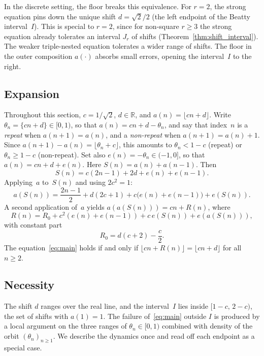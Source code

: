\documentclass{birkjour}
\theoremstyle{definition}
\theoremstyle{remark}
\newcommand{\fl}[1]{\lfloor #1 \rfloor}
\newcommand{\frc}[1]{\{ #1 \}}
\begin{document}
In the discrete setting, the floor breaks this
equivalence. For $r=2$, the strong equation pins down the
unique shift $d=\sqrt{2}/2$ (the left endpoint of the Beatty
interval~$I$). This is special to $r=2$, since for
non-square $r\ge 3$ the strong equation already tolerates an
interval $J_{r}$ of shifts (Theorem~\ref{thm:shift_interval}).
The weaker triple-nested equation tolerates a wider range
of shifts. The floor in the outer composition
$a(\cdot)$ absorbs small errors, opening the
interval~$I$ to the right.

\subsection{Expansion}
Throughout this section, $c=1/\!\sqrt{2}$,
$d\in\mathbb{R}$, and $a(n)=\fl{cn+d}$.
Write $\theta_{n}=\frc{cn+d}\in[0,1)$, so that
$a(n)=cn+d-\theta_{n}$, and say that index~$n$
is a \emph{repeat} when $a(n{+}1)=a(n)$, and a
\emph{non-repeat} when $a(n{+}1)=a(n){+}1$.
Since $a(n{+}1)-a(n)=\fl{\theta_{n}+c}$, this amounts
to $\theta_{n}<1{-}c$ (repeat) or
$\theta_{n}\ge 1{-}c$ (non-repeat).
Set also $e(n)=-\theta_{n}\in(-1,0]$, so that
$a(n)=cn+d+e(n)$.
Here $S(n)=a(n)+a(n{-}1)$. Then
\begin{equation*}  S(n) = c(2n{-}1)+2d+e(n)+e(n{-}1).
\end{equation*}
Applying~$a$ to~$S(n)$ and using $2c^{2}=1$:
\begin{equation}\label{eq:aS}
  a(S(n)) = \frac{2n{-}1}{2} + d(2c{+}1)
  + c\bigl(e(n)+e(n{-}1)\bigr) + e(S(n)).
\end{equation}
A second application of~$a$ yields
$a(a(S(n)))= cn + R(n)$,
where
\begin{equation*}  R(n)=R_{0}+c^{2}(e(n)+e(n{-}1))
  +c\,e(S(n))+e(a(S(n))),
\end{equation*}
with constant part
\begin{equation*}  R_{0}
  =d(c+2)-\frac{c}{2}.
\end{equation*}
The equation~\eqref{eq:main} holds if and only if
$\fl{cn+R(n)}=\fl{cn+d}$ for all $n\ge 2$.

\subsection{Necessity}
\label{ssec:necessity}

The shift $d$ ranges over the real line, and the
interval~$I$ lies inside $[1-c,\,2-c)$, the set of shifts
with $a(1)=1$. The failure of~\eqref{eq:main} outside $I$ is
produced by a local argument on the three ranges of
$\theta_{n}\in[0,1)$ combined with density of the orbit
$(\theta_{n})_{n\ge 1}$. We describe the dynamics once and
read off each endpoint as a special case.
\end{document}
